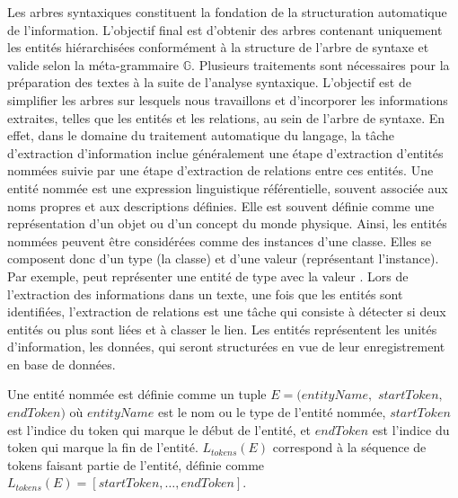 Les arbres syntaxiques constituent la fondation de la structuration automatique de l'information.
L'objectif final est d'obtenir des arbres contenant uniquement les entités hiérarchisées conformément à la structure de l'arbre de syntaxe et valide selon la méta-grammaire $\mathbb{G}$.
Plusieurs traitements sont nécessaires pour la préparation des textes à la suite de l'analyse syntaxique.
L'objectif est de simplifier les arbres sur lesquels nous travaillons et d'incorporer les informations extraites, telles que les entités et les relations, au sein de l'arbre de syntaxe.
En effet, dans le domaine du traitement automatique du langage, la tâche d'extraction d'information inclue généralement une étape d'extraction d'entités nommées suivie par une étape d'extraction de relations entre ces entités.
Une entité nommée est une expression linguistique référentielle, souvent associée aux noms propres et aux descriptions définies.
Elle est souvent définie comme une représentation d'un objet ou d'un concept du monde physique.
Ainsi, les entités nommées peuvent être considérées comme des instances d'une classe.
Elles se composent donc d'un type (la classe) et d'une valeur (représentant l'instance).
Par exemple,  peut représenter une entité de type  avec la valeur .
Lors de l'extraction des informations dans un texte, une fois que les entités sont identifiées, l'extraction de relations est une tâche qui consiste à détecter si deux entités ou plus sont liées et à classer le lien.
Les entités représentent les unités d'information, les données, qui seront structurées en vue de leur enregistrement en base de données.


\begin{definition}
    \label{def:struct:entity}
    Une entité nommée est définie comme un tuple $E = (entityName,$ $startToken,$ $endToken)$ où $entityName$ est le nom ou le type de l'entité nommée, $startToken$ est l'indice du token qui marque le début de l'entité, et $endToken$ est l'indice du token qui marque la fin de l'entité.
    $L_{tokens}(E)$ correspond à la séquence de tokens faisant partie de l'entité, définie comme $L_{tokens}(E) = [startToken, \dots, endToken]$.
\end{definition}

